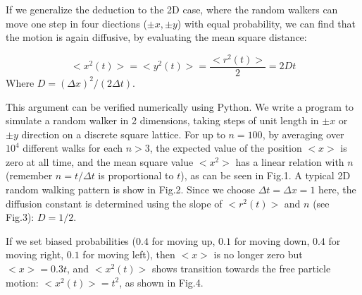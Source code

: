 \documentclass[aps,prl,preprint,superscriptaddress]{revtex4}
\begin{document}
	If we generalize the deduction to the 2D case, where the random walkers can move one step in four diections ($\pm x, \pm y$) with equal probability, we can find that the motion is again diffusive, by evaluating the mean square distance:
	
	\begin{equation}
	<x^2(t)> = <y^2(t)> = \frac{<r^2(t)>}{2}= 2Dt
	\end{equation}
	Where $D = (\Delta x)^2/(2\Delta t)$.
	
	This argument can be verified numerically using Python. We write a program to simulate a random walker in 2 dimensions, taking steps
	of unit length in $\pm x$ or $\pm y$ direction on a discrete square lattice. For up to $n = 100$, by averaging over $10^4$ different walks for each $n > 3$, the expected value of the position $ <x> $ is zero at all time, and the mean square value  $ <x^2> $ has a linear relation with $n$(remember $n =t/\Delta t$ is proportional to $t$), as can be seen in Fig.1. A typical 2D random walking pattern is show in Fig.2. Since we choose $\Delta t = \Delta x = 1$ here, the diffusion constant is determined using the slope of $<r^2(t)>$ and $n$ (see Fig.3): $D = 1/2$.
	
	If we set biased probabilities ($ 0.4$ for moving up, $0.1$ for moving down, $0.4$ for moving right, $0.1$ for moving left), then $ <x> $ is no longer zero but  $ <x> = 0.3t $, and $<x^2(t)>$ shows transition towards the free particle motion: $<x^2(t)> = t^2$, as shown in Fig.4.
	
\end{document}
